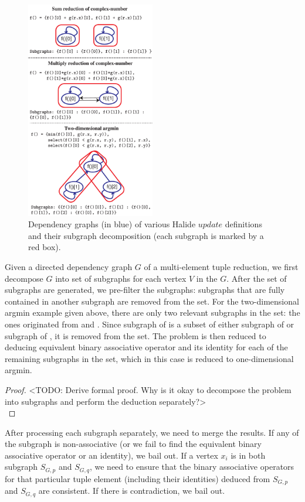 \begin{figure}
\centering
\includegraphics[width=0.5\textwidth]{subgraphs}
\caption{Dependency graphs (in blue) of various Halide $update$ definitions and their subgraph decomposition (each subgraph is marked by a red box).}
\label{fig:subgraphs_decomposition}
\end{figure}

Given a directed dependency graph $G$ of a multi-element tuple reduction, we first decompose $G$ into set of subgraphs for each vertex $V$ in the $G$. After the set of subgraphs are generated, we pre-filter the subgraphs: subgraphs that are fully contained in another subgraph are removed from the set. For the two-dimensional argmin example given above, there are only two relevant subgraphs in the set: the ones originated from  and . Since subgraph of  is a subset of either subgraph of  or subgraph of , it is removed from the set. The problem is then reduced to deducing equivalent binary associative operator and its identity for each of the remaining subgraphs in the set, which in this case is reduced to one-dimensional argmin. 

\begin{proof}
<TODO: Derive formal proof. Why is it okay to decompose the problem into subgraphs and perform the deduction separately?> \\
\end{proof}

After processing each subgraph separately, we need to merge the results. If any of the subgraph is non-associative (or we fail to find the equivalent binary associative operator or an identity), we bail out. If a vertex $x_i$ is in both subgraph $S_{G, p}$ and $S_{G, q}$, we need to ensure that the binary associative operators for that particular tuple element (including their identities) deduced from $S_{G, p}$ and $S_{G, q}$ are consistent. If there is contradiction, we bail out.  

